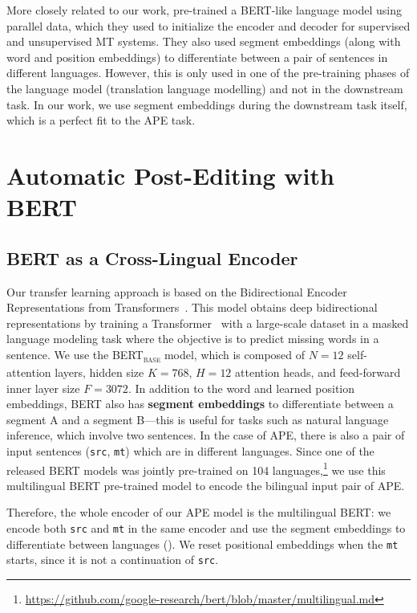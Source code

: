 More closely related to our work, \citet{lample2019xlm}
pre-trained a BERT-like language model using parallel data, which
they used to initialize the encoder and decoder for supervised and
unsupervised MT systems. They also used segment embeddings (along
with word and position embeddings) to differentiate between a pair of
sentences in different languages. However, this is only used in one
of the pre-training phases of the language model (translation
language modelling) and not in the downstream task. In our work, we
use segment embeddings during the downstream task itself, which is a
perfect fit to the APE task.

\section{Automatic Post-Editing with BERT}\label{sec:ape_bert}

\subsection{BERT as a Cross-Lingual Encoder}

Our transfer learning approach is based on the Bidirectional Encoder
Representations from Transformers~\citep[BERT;][]{devlin2018bert}.
This model obtains deep bidirectional representations by training a
Transformer~\citep{vaswani2017attention} with a large-scale dataset
in a masked language modeling task where the objective is to predict
missing words in a sentence. We use the BERT\textsubscript{\textsc{base}}
model, which is composed of $N\!\!=\!\!12$ self-attention layers, hidden size
$K\!\!=\!\!768$, $H\!\!=\!\!12$ attention heads, and feed-forward inner layer size
$F\!\!=\!\!3072$. In addition to the word and learned position embeddings,
BERT also has {\bf segment embeddings} to differentiate between a
segment A and a segment B---this is useful for tasks such as natural
language inference, which involve two sentences. In the case of APE,
there is also a pair of input sentences ({\tt src}, {\tt mt}) which
are in different languages. Since one of the released BERT models was
jointly pre-trained on 104 languages,\footnote{
    \url{https://github.com/google-research/bert/blob/master/multilingual.md}}
we use this multilingual BERT pre-trained model to encode the
bilingual input pair of APE.

Therefore, the whole encoder of our APE model is the multilingual
BERT: we encode both {\tt src} and {\tt mt} in the same encoder and
use the segment embeddings to differentiate between languages
(). We reset positional
embeddings when the {\tt mt} starts, since it is not a continuation
of {\tt src}.

